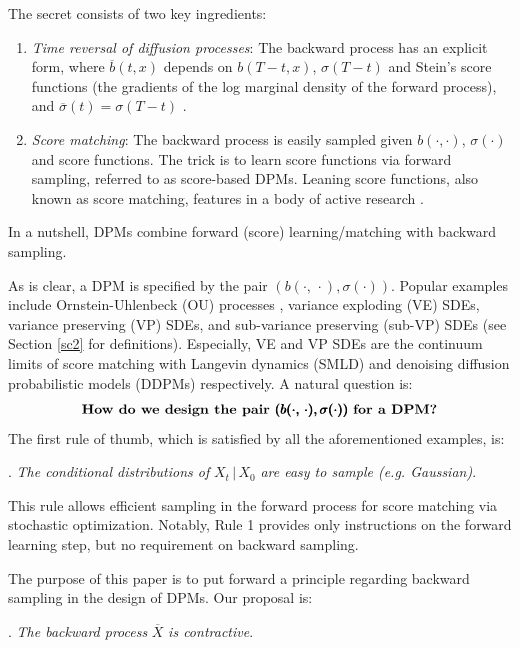 \documentclass[letterpaper,11pt,reqno]{amsart}
\numberwithin{equation}{section}
\begin{document}
The secret consists of two key ingredients:
\begin{enumerate}[itemsep = 3 pt]
\item
{\em Time reversal of diffusion processes}:
The backward process has an explicit form,
where $\overline{b}(t,x)$ depends on $b(T-t,x)$, $\sigma(T-t)$ and Stein's score functions
(the gradients of the log marginal density of the forward process),
and $\overline{\sigma}(t)=\sigma(T-t)$ \cite{HP86, CCGL21}.
\item
{\em Score matching}: The backward process is easily sampled 
given $b(\cdot,\cdot)$, $\sigma(\cdot)$ and score functions.
The trick is to learn score functions via forward sampling,
referred to as score-based DPMs.
Leaning score functions, also known as score matching,
features in a body of active research
\cite{Hyv05, Vi11, Song20sl, Koe22}.
\end{enumerate}
In a nutshell, DPMs combine forward (score) learning/matching with backward sampling.

\quad As is clear, a DPM is specified by the pair $(b(\cdot, \, \cdot),  \sigma(\cdot))$.
Popular examples include
Ornstein-Uhlenbeck (OU) processes \cite{DV21},
variance exploding (VE) SDEs,
variance preserving (VP) SDEs,
and sub-variance preserving (sub-VP) SDEs \cite{Song20} (see Section \ref{sc2} for definitions).
Especially, 
VE and VP SDEs are the continuum limits of 
score matching with Langevin dynamics (SMLD) \cite{Song19}
and denoising diffusion probabilistic models (DDPMs) \cite{Ho20} respectively.
A natural question is:
\begin{equation*}
\mbox{\bf How do we design the pair } \pmb{(b(\cdot, \, \cdot),  \sigma(\cdot))} \mbox{ \bf for a DPM?}
\end{equation*}
The first rule of thumb, which is satisfied by all the aforementioned examples,  is:

\smallskip
\noindent
{}. {\em The conditional distributions of} $X_t \,|\, X_0$ {\em are easy to sample (e.g. Gaussian)}.

This rule allows efficient sampling in the forward process
for score matching via stochastic optimization.
Notably, Rule 1 provides only instructions on the forward learning step,
but no requirement on backward sampling. 

\quad The purpose of this paper is to put forward a principle regarding backward sampling
in the design of DPMs.
Our proposal is:

\smallskip
\noindent
{}. {\em The backward process } $\overline{X}$ {\em is contractive}.
\end{document}
